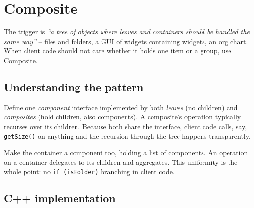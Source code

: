 \section{Composite}
\label{sec:pat-composite}


\begin{patternbox}
The trigger is \emph{``a tree of objects where leaves and containers
should be handled the same way''} -- files and folders, a GUI of widgets
containing widgets, an org chart. When client code should not care whether
it holds one item or a group, use Composite.
\end{patternbox}

\subsection*{Understanding the pattern}

Define one \emph{component} interface implemented by both \emph{leaves}
(no children) and \emph{composites} (hold children, also components). A
composite's operation typically recurses over its children. Because both
share the interface, client code calls, say, \texttt{getSize()} on
anything and the recursion through the tree happens transparently.

\begin{ideabox}
Make the container a component too, holding a list of components. An
operation on a container delegates to its children and aggregates. This
uniformity is the whole point: no \texttt{if (isFolder)} branching in
client code.
\end{ideabox}

\subsection*{C++ implementation}

